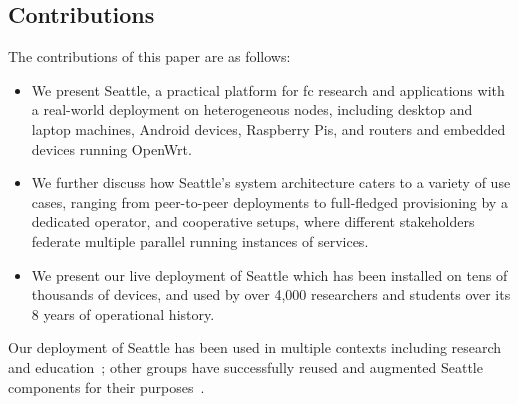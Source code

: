 \subsection{Contributions}

The contributions of this paper are as follows:
\begin{itemize}
\item We present Seattle, a practical platform for \gls{fc} research
and applications
with a real-world deployment on heterogeneous nodes,
including desktop and laptop machines, Android devices,
Raspberry Pis,
and routers and embedded devices running OpenWrt.
\item We further discuss how
Seattle's system architecture caters to a variety of use cases,
ranging from peer-to-peer deployments to full-fledged
provisioning by a dedicated operator, and cooperative setups,
where different stakeholders federate multiple parallel running
instances of services.
\item We present our live deployment of Seattle which has been
installed on tens of thousands of devices, and used by over 4,000
researchers and students over its 8 years of operational history.
\end{itemize}
Our deployment of Seattle has been used in multiple contexts
including research~\cite{li2015fence,rafetseder2013sensorium,zhuang2014sensibility,Eisl1010:Service,Tuts1010:Sustained,collares2011smart,zhuang2015privacy,cappos2014blursense,7133607} and education~\cite{Wallace_CCSC_2011,Cappos_CCSCCP_2010,Cappos_CCSCNW_2009,Cappos_SIGCSE_2014,Hooshangi_SIGCSE_2015};
other groups have successfully reused and augmented Seattle components
for their purposes~\cite{chard2010social,chard12ssc,caton2014social,muller2014tomato,tomato,eittenberger2012doubtless,zhuang2012distributed,zhuang2014taking,tredger2013building}.
